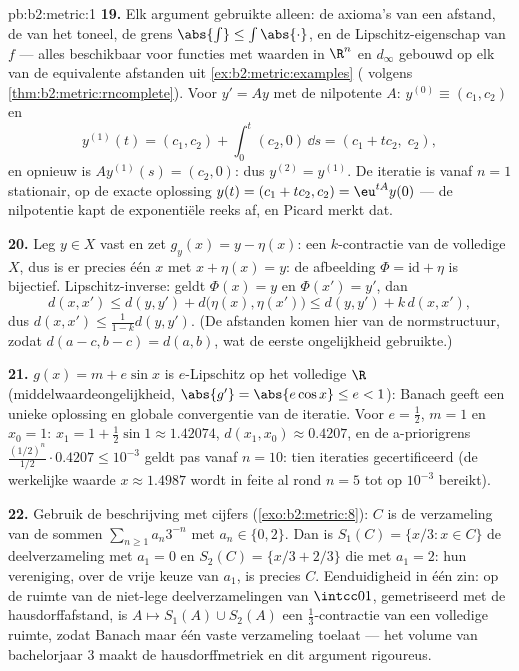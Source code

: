 \begin{solution}{pb:b2:metric:1}
\textbf{19.} Elk argument gebruikte alleen: de axioma's van een
afstand, de  van het toneel, de grens $\abs{\int} \leq
\int\abs{\cdot}$, en de Lipschitz-eigenschap van $f$ --- alles
beschikbaar voor functies met waarden in $\R^n$ en $d_\infty$
gebouwd op elk van de equivalente afstanden uit
\cref{ex:b2:metric:examples} ( volgens
\cref{thm:b2:metric:rncomplete}). Voor $y' = Ay$ met de nilpotente
$A$: $y^{(0)} \equiv (c_1, c_2)$ en
\[
y^{(1)}(t) = (c_1, c_2) + \int_0^t (c_2, 0)\,\dd s
= (c_1 + tc_2,\; c_2),
\]
en opnieuw is $Ay^{(1)}(s) = (c_2, 0)$: dus $y^{(2)} = y^{(1)}$. De
iteratie is vanaf $n = 1$ stationair, op de exacte oplossing $y(t)
= (c_1 + tc_2, c_2) = \eu^{tA}y(0)$ --- de nilpotentie kapt de
exponentiële reeks af, en Picard merkt dat.

\textbf{20.} Leg $y \in X$ vast en zet $g_y(x) = y - \eta(x)$: een
$k$-contractie van de volledige $X$, dus is er precies één $x$ met
$x + \eta(x) = y$: de afbeelding $\Phi = \mathrm{id} + \eta$ is
bijectief. Lipschitz-inverse: geldt $\Phi(x) = y$ en $\Phi(x') =
y'$, dan
\[
d(x, x') \leq d(y, y') + d\bigl(\eta(x), \eta(x')\bigr)
\leq d(y, y') + k\,d(x, x'),
\]
dus $d(x, x') \leq \frac{1}{1-k}d(y, y')$. (De afstanden komen hier
van de normstructuur, zodat $d(a - c, b - c) = d(a, b)$, wat de
eerste ongelijkheid gebruikte.)

\textbf{21.} $g(x) = m + e\sin x$ is $e$-Lipschitz op het volledige
$\R$ (middelwaardeongelijkheid, $\abs{g'} = \abs{e\cos x} \leq e <
1$): Banach geeft een unieke oplossing en globale convergentie van
de iteratie. Voor $e = \frac12$, $m = 1$ en $x_0 = 1$: $x_1 = 1 +
\frac12\sin 1 \approx 1.42074$, $d(x_1, x_0) \approx 0.4207$, en de
a-priorigrens $\frac{(1/2)^n}{1/2}\cdot 0.4207 \leq 10^{-3}$ geldt
pas vanaf $n = 10$: tien iteraties gecertificeerd (de werkelijke
waarde $x \approx 1.4987$ wordt in feite al rond $n = 5$ tot op
$10^{-3}$ bereikt).

\textbf{22.} Gebruik de beschrijving met cijfers
(\cref{exo:b2:metric:8}): $C$ is de verzameling van de sommen
$\sum_{n\geq1}a_n3^{-n}$ met $a_n \in \{0, 2\}$. Dan is $S_1(C) =
\{x/3 : x \in C\}$ de deelverzameling met $a_1 = 0$ en $S_2(C) =
\{x/3 + 2/3\}$ die met $a_1 = 2$: hun vereniging, over de vrije
keuze van $a_1$, is precies $C$. Eenduidigheid in één zin: op de
ruimte van de niet-lege  deelverzamelingen van $\intcc01$,
gemetriseerd met de hausdorffafstand, is $A \mapsto S_1(A) \cup
S_2(A)$ een $\frac13$-contractie van een volledige ruimte, zodat
Banach maar één vaste verzameling toelaat --- het volume van
bachelorjaar 3 maakt de hausdorffmetriek en dit argument
rigoureus.


\end{solution}
